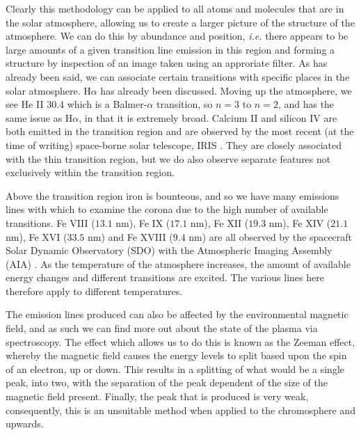 Clearly this methodology can be applied to all atoms and molecules that are in the solar atmosphere, allowing us to create a larger picture of the structure of the atmosphere.
We can do this by abundance and position, \emph{i.e.} there appears to be large amounts of a given transition line emission in this region and forming a structure by inspection of an image taken using an approriate filter.
As has already been said, we can associate certain transitions with specific places in the solar atmosphere.
H$\alpha$ has already been discussed.
Moving up the atmosphere, we see He II $30.4$ \cite{Bazin2010} which is a Balmer-$\alpha$ transition, so $n=3$ to $n=2$, and has the same issue as H$\alpha$, in that it is extremely broad.
Calcium II and silicon IV are both emitted in the transition region and are observed by the most recent (at the time of writing) space-borne solar telescope, IRIS \cite{DePontieu2014}.
They are closely associated with the thin transition region, but we do also observe separate features not exclusively within the transition region.

Above the transition region iron is bounteous, and so we have many emissions lines with which to examine the corona due to the high number of available transitions.
Fe VIII ($13.1$ nm), Fe IX ($17.1$ nm), Fe XII ($19.3$ nm), Fe XIV ($21.1$ nm), Fe XVI ($33.5$ nm) and Fe XVIII ($9.4$ nm) are all observed by the spacecraft Solar Dynamic Observatory (SDO) with the Atmospheric Imaging Assembly (AIA) \cite{Schmelz2013}.
As the temperature of the atmosphere increases, the amount of available energy changes and different transitions are excited.
The various lines here therefore apply to different temperatures.



The emission lines produced can also be affected by the environmental magnetic field, and as such we can find more out about the state of the plasma via spectroscopy.
The effect which allows us to do this is known as the Zeeman effect, whereby the magnetic field causes the energy levels to split based upon the spin of an electron, up or down.
This results in a splitting of what would be a single peak, into two, with the separation of the peak dependent of the size of the magnetic field present.
Finally, the peak that is produced is very weak, consequently, this is an unsuitable method when applied to the chromosphere and upwards.


